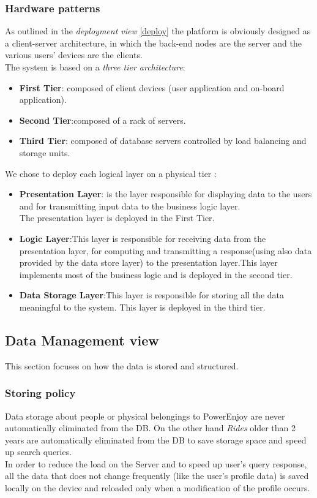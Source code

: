 \subsubsection{Hardware patterns}
As outlined in the \emph{deployment view} \ref{deploy} the platform is obviously designed as a client-server architecture, in which the back-end nodes are the server and the various users' devices are the clients.\\
The system is based on a \emph{three tier architecture}:
\begin{itemize}
\item \textbf{First Tier}: composed of client devices (user application and on-board application).
\item \textbf{Second Tier}:composed of a rack of servers.
\item \textbf{Third Tier}: composed of database servers controlled by load balancing and storage units.
\end{itemize}
We chose to deploy each logical layer on a physical tier :
\begin{itemize}
\item \textbf{Presentation Layer}: is the layer responsible for displaying data to
the users and for transmitting input data to the business logic layer.\\
The presentation layer is deployed in the First Tier.
\item \textbf{Logic Layer}:This layer is responsible for receiving data
from the presentation layer, for computing and transmitting a response(using also data provided by the data store layer) to the presentation
layer.This layer implements most of the business logic and is deployed in the
second tier.
\item \textbf{Data Storage Layer}:This layer is responsible for storing all the data meaningful to the system. This layer is deployed in the third tier.
\end{itemize}

\newpage

\subsection{Data Management view}
\label{sec:DMV}
This section focuses on how the data is stored and structured.
\subsubsection{Storing policy}
Data storage about people or physical belongings to PowerEnjoy are never automatically eliminated from the DB. On the other hand \emph{Rides} older than 2 years are automatically eliminated from the DB to save storage space and 
speed up search queries.\\
In order to reduce the load on the Server and to speed up user’s query
response, all the data that does not change frequently (like the user’s profile
data) is saved locally on the device and reloaded only when a modification
of the profile occurs.

